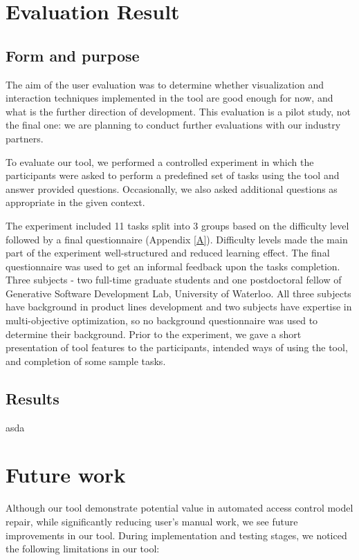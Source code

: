 \documentclass{acm_proc_article-sp}
\begin{document}
\section{Evaluation Result}

\subsection{Form and purpose}

The aim of the user evaluation was to determine whether visualization and interaction techniques implemented in the tool are good enough for now, and what is the further direction of development. This evaluation is a pilot study, not the final one: we are planning to conduct further evaluations with our industry partners.

To evaluate our tool, we performed a controlled experiment in which the participants were asked to perform a predefined set of tasks using the tool and answer provided questions. Occasionally, we also asked additional questions as appropriate in the given context.

The experiment included 11 tasks split into 3 groups based on the difficulty level followed by a final questionnaire (Appendix \ref{A}). Difficulty levels made the main part of the experiment well-structured and reduced learning effect. The final questionnaire was used to get an informal feedback upon the tasks completion. Three subjects - two full-time graduate students and one postdoctoral fellow of Generative Software Development Lab, University of Waterloo. All three subjects have background in product lines development and two subjects have expertise in multi-objective optimization, so no background questionnaire was used to determine their background. Prior to the experiment, we gave a short presentation of tool features to the participants, intended ways of using the tool, and completion of some sample tasks.

\subsection{Results}
asda


\section{Future work}

Although our tool demonstrate potential value in automated access control model repair, while significantly reducing user's manual work, we see future improvements in our tool. During implementation and testing stages, we noticed the following limitations in our tool:
\end{document}
